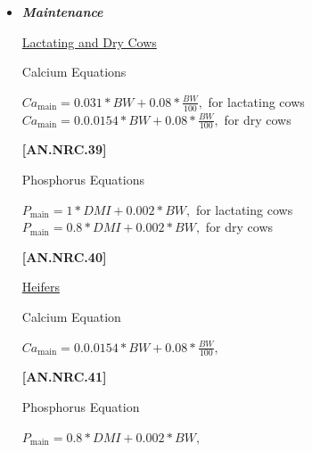 \documentclass{article}
\begin{document}
\begin{refsection}
    \begin{itemize}
        \item \textbf{\textit{Maintenance}} 
        \vspace{0.2cm}
        
        \underline{Lactating and Dry Cows}
\vspace{0.2cm}

Calcium Equations
\begin{center}
    \(Ca_{\text{main}} = 0.031 * BW + 0.08 * \frac{BW}{100},\) for lactating cows\\
    \vspace{0.2cm}
    \(Ca_{\text{main}} = 0.0.0154 * BW + 0.08 * \frac{BW}{100},\) for dry cows
\end{center}

\vspace{0.5cm}
            {\raggedleft \textbf{[AN.NRC.39]}\par}

\vspace{0.5cm}
Phosphorus Equations
\vspace{0.5cm}

\begin{center}
    \(P_{\text{main}} = 1 * DMI + 0.002 * BW, \) for lactating cows\\
    \vspace{0.25cm}
    \(P_{\text{main}} = 0.8 * DMI + 0.002 * BW, \) for dry cows
\end{center}

\vspace{0.5cm}
            {\raggedleft \textbf{[AN.NRC.40]}\par}
\vspace{0.25cm}

        {\underline{Heifers}}
                \vspace{0.2cm}

Calcium Equation
\begin{center}
    \(Ca_{\text{main}} = 0.0.0154 * BW + 0.08 * \frac{BW}{100}, \)
\end{center}

\vspace{0.5cm}
            {\raggedleft \textbf{[AN.NRC.41]}\par}
            \vspace{0.5cm}

Phosphorus Equation
\begin{center}
    \(P_{\text{main}} =  0.8 * DMI + 0.002 * BW, \)
\end{center}


\end{itemize}
\end{refsection}
\end{document}
